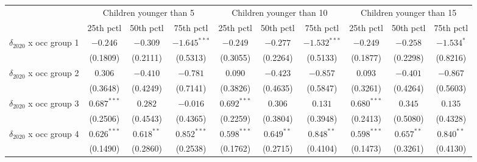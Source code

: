 \begin{tabular}{l|ccc|ccc|ccc}
\toprule
{} & \multicolumn{3}{c}{Children younger than 5} & \multicolumn{3}{c}{Children younger than 10} & \multicolumn{3}{c}{Children younger than 15} \\
{} &               25th pctl &       50th pctl &       75th pctl &                25th pctl &       50th pctl &       75th pctl &                25th pctl &       50th pctl &       75th pctl \\
\midrule
$\delta_{2020}$ x occ group 1          &                $-0.246$ &        $-0.309$ &  $-1.645^{***}$ &                 $-0.249$ &        $-0.277$ &  $-1.532^{***}$ &                 $-0.249$ &        $-0.258$ &      $-1.534^*$ \\
                                       &                (0.1809) &        (0.2111) &        (0.5313) &                 (0.3055) &        (0.2264) &        (0.5133) &                 (0.1877) &        (0.2298) &        (0.8216) \\
$\delta_{2020}$ x occ group 2          &                 $0.306$ &        $-0.410$ &        $-0.781$ &                  $0.090$ &        $-0.423$ &        $-0.857$ &                  $0.093$ &        $-0.401$ &        $-0.867$ \\
                                       &                (0.3648) &        (0.4249) &        (0.7141) &                 (0.3826) &        (0.4635) &        (0.5847) &                 (0.3261) &        (0.4264) &        (0.5603) \\
$\delta_{2020}$ x occ group 3          &           $0.687^{***}$ &         $0.282$ &        $-0.016$ &            $0.692^{***}$ &         $0.306$ &         $0.131$ &            $0.680^{***}$ &         $0.345$ &         $0.135$ \\
                                       &                (0.2506) &        (0.4543) &        (0.4365) &                 (0.2259) &        (0.3804) &        (0.3948) &                 (0.2413) &        (0.5080) &        (0.4328) \\
$\delta_{2020}$ x occ group 4          &           $0.626^{***}$ &    $0.618^{**}$ &   $0.852^{***}$ &            $0.598^{***}$ &    $0.649^{**}$ &    $0.848^{**}$ &            $0.598^{***}$ &    $0.657^{**}$ &    $0.840^{**}$ \\
                                       &                (0.1490) &        (0.2860) &        (0.2538) &                 (0.1762) &        (0.2715) &        (0.4104) &                 (0.1473) &        (0.3261) &        (0.4130) \\

\end{tabular}
